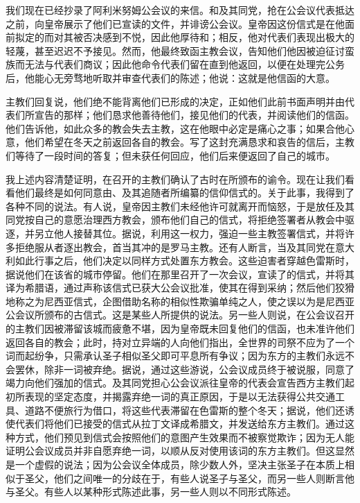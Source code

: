 我们现在已经抄录了阿利米努姆公会议的来信。和及其同党，抢在公会议代表抵达之前，向皇帝展示了他们已宣读的文件，并诽谤公会议。皇帝因这份信式是在他面前拟定的而对其被否决感到不悦，因此他厚待和；相反，他对代表们表现出极大的轻蔑，甚至迟迟不予接见。然而，他最终致函主教会议，告知他们他因被迫征讨蛮族而无法与代表们商议；因此他命令代表们留在直到他返回，以便在处理完公务后，他能心无旁骛地听取并审查代表们的陈述；他说：这就是他信函的大意。\par

主教们回复说，他们绝不能背离他们已形成的决定，正如他们此前书面声明并由代表们所宣告的那样；他们恳求他善待他们，接见他们的代表，并阅读他们的信函。他们告诉他，如此众多的教会失去主教，这在他眼中必定是痛心之事；如果合他心意，他们希望在冬天之前返回各自的教会。写了这封充满恳求和哀告的信后，主教们等待了一段时间的答复；但未获任何回应，他们后来便返回了自己的城市。\par

我上述内容清楚证明，在召开的主教们确认了古时在所颁布的谕令。现在让我们看看他们最终是如何同意由、及其追随者所编纂的信仰信式的。关于此事，我得到了各种不同的说法。有人说，皇帝因主教们未经他许可就离开而恼怒，于是放任及其同党按自己的意愿治理西方教会，颁布他们自己的信式，将拒绝签署者从教会中驱逐，并另立他人接替其位。据说，利用这一权力，强迫一些主教签署信式，并将许多拒绝服从者逐出教会，首当其冲的是罗马主教。还有人断言，当及其同党在意大利如此行事之后，他们决定以同样方式处置东方教会。这些迫害者穿越色雷斯时，据说他们在该省的城市停留。他们在那里召开了一次会议，宣读了的信式，并将其译为希腊语，通过声称该信式已获大公会议批准，使其在得到采纳；然后他们狡猾地称之为尼西亚信式，企图借助名称的相似性欺骗单纯之人，使之误以为是尼西亚公会议所颁布的古信式。这是某些人所提供的说法。另一些人则说，在公会议召开的主教们因被滞留该城而疲惫不堪，因为皇帝既未回复他们的信函，也未准许他们返回各自的教会；此时，持对立异端的人向他们指出，全世界的司祭不应为了一个词而起纷争，只需承认圣子相似圣父即可平息所有争议；因为东方的主教们永远不会罢休，除非一词被弃绝。据说，通过这些游说，公会议成员终于被说服，同意了竭力向他们强加的信式。及其同党担心公会议派往皇帝的代表会宣告西方主教们起初所表现的坚定态度，并揭露弃绝一词的真正原因，于是以无法获得公共交通工具、道路不便旅行为借口，将这些代表滞留在色雷斯的整个冬天；据说，他们还诱使代表们将他们已接受的信式从拉丁文译成希腊文，并发送给东方主教们。通过这种方式，他们预见到信式会按照他们的意图产生效果而不被察觉欺诈；因为无人能证明公会议成员并非自愿弃绝一词，以顺从反对使用该词的东方主教们。但这显然是一个虚假的说法；因为公会议全体成员，除少数人外，坚决主张圣子在本质上相似于圣父，他们之间唯一的分歧在于，有些人说圣子与圣父，而另一些人则断言他与圣父。有些人以某种形式陈述此事，另一些人则以不同形式陈述。\par

